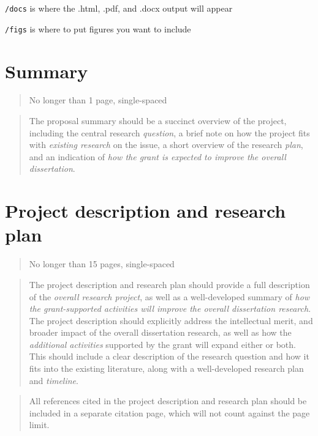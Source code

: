 \documentclass[
      12pt,
        ]{article}
\begin{document}
\texttt{/docs} is where the .html, .pdf, and .docx output will appear

\texttt{/figs} is where to put figures you want to include

\newpage

\hypertarget{summary}{%
\section{Summary}\label{summary}}

\begin{quote}
No longer than 1 page, single-spaced
\end{quote}

\begin{quote}
The proposal summary should be a succinct overview of the project, including the central research \emph{question}, a brief note on how the project fits with \emph{existing research} on the issue, a short overview of the research \emph{plan}, and an indication of \emph{how the grant is expected to improve the overall dissertation}.
\end{quote}

\newpage

\hypertarget{project-description-and-research-plan}{%
\section{Project description and research plan}\label{project-description-and-research-plan}}

\begin{quote}
No longer than 15 pages, single-spaced
\end{quote}

\begin{quote}
The project description and research plan should provide a full description of the \emph{overall research project}, as well as a well-developed summary of \emph{how the grant-supported activities will improve the overall dissertation research}. The project description should explicitly address the intellectual merit, and broader impact of the overall dissertation research, as well as how the \emph{additional activities} supported by the grant will expand either or both. This should include a clear description of the research question and how it fits into the existing literature, along with a well-developed research plan and \emph{timeline}.
\end{quote}

\begin{quote}
All references cited in the project description and research plan should be included in a separate citation page, which will not count against the page limit.
\end{quote}
\end{document}
